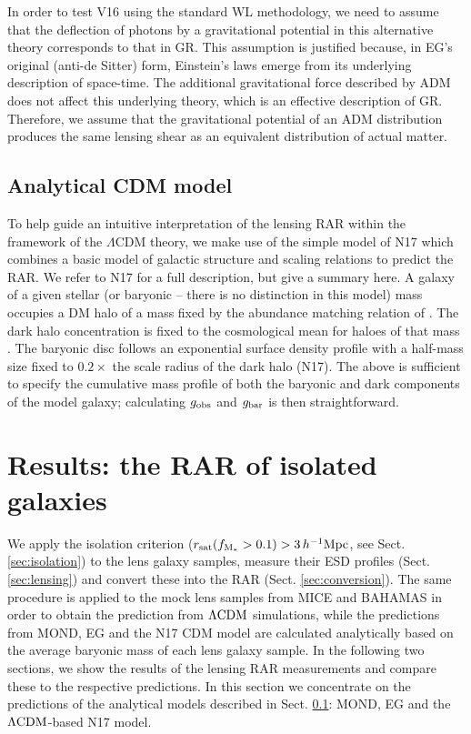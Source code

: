 \documentclass[usenatbib]{mnras}
\newcommand{\hMpc}{\, h^{-1}{\rm{Mpc}} }
\newcommand{\lcdm}{{\rm \Lambda CDM}}
\newcommand{\un}[1]{_{\rm #1}}
\begin{document}
In order to test V16 using the standard WL methodology, we need to assume that the deflection of photons by a gravitational potential in this alternative theory corresponds to that in GR. This assumption is justified because, in EG's original (anti-de Sitter) form, Einstein's laws emerge from its underlying description of space-time. The additional gravitational force described by ADM does not affect this underlying theory, which is an effective description of GR. Therefore, we assume that the gravitational potential of an ADM distribution produces the same lensing shear as an equivalent distribution of actual matter.

\subsection{Analytical CDM model}
\label{sec:analytical}

To help guide an intuitive interpretation of the lensing RAR within the framework of the $\Lambda$CDM theory, we make use of the simple model of N17 which combines a basic model of galactic structure and scaling relations to predict the RAR. We refer to N17 for a full description, but give a summary here. A galaxy of a given stellar (or baryonic -- there is no distinction in this model) mass occupies a DM halo of a mass fixed by the abundance matching relation of \citet{behroozi2013}. The dark halo concentration is fixed to the cosmological mean for haloes of that mass \citep{ludlow2014}. The baryonic disc follows an exponential surface density profile with a half-mass size fixed to $0.2\times$ the scale radius of the dark halo (N17). The above is sufficient to specify the cumulative mass profile of both the baryonic and dark components of the model galaxy; calculating $g\un{obs}$ and $g\un{bar}$ is then straightforward.


\section{Results: the RAR of isolated galaxies}
\label{sec:results}

We apply the isolation criterion ($r\un{sat}(f\un{M_*}>0.1)>3\hMpc$, see Sect. \ref{sec:isolation}) to the lens galaxy samples, measure their ESD profiles (Sect. \ref{sec:lensing}) and convert these into the RAR (Sect. \ref{sec:conversion}). The same procedure is applied to the mock lens samples from MICE and BAHAMAS in order to obtain the prediction from $\lcdm$ simulations, while the predictions from MOND, EG and the N17 CDM model are calculated analytically based on the average baryonic mass of each lens galaxy sample. In the following two sections, we show the results of the lensing RAR measurements and compare these to the respective predictions. In this section we concentrate on the predictions of the analytical models described in Sect. \ref{sec:analytical}: MOND, EG and the $\lcdm$-based N17 model.
\end{document}
